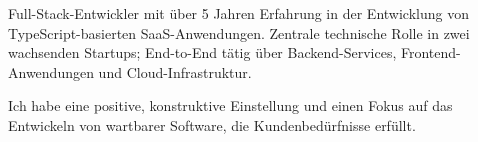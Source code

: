 \documentclass[8pt]{developercv} %
\begin{document}
\vspace{0.5cm}



\begin{minipage}[t]{0.4\textwidth} %
	\vspace{-\baselineskip} %
	
Full-Stack-Entwickler mit über 5 Jahren Erfahrung in der Entwicklung von TypeScript-basierten SaaS-Anwendungen.
Zentrale technische Rolle in zwei wachsenden Startups; End-to-End tätig über Backend-Services,
Frontend-Anwendungen und Cloud-Infrastruktur.

Ich habe eine positive, konstruktive Einstellung und einen Fokus auf das Entwickeln von wartbarer Software, die Kundenbedürfnisse erfüllt.

\end{minipage}
\hfill %
\begin{minipage}[t]{0.5\textwidth} %
	\vspace{-\baselineskip} %
	\begin{barchart}{5.5}
	\end{barchart}
\end{minipage}



\end{document}
